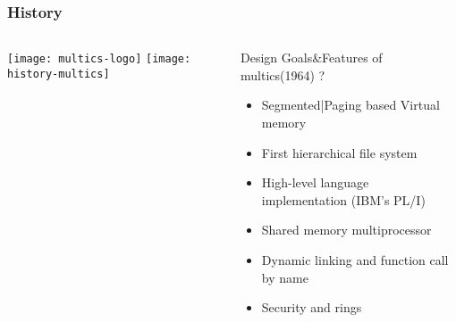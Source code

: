 \begin{frame}[plain]
	\frametitle{History}
	
	
	
	\begin{columns}
		
		\begin{column}{.5\textwidth}
			\texttt{[image: multics-logo]}
			\texttt{[image: history-multics]}
			
			
			
		\end{column}
		
		\begin{column}{.5\textwidth}
			
			\large
			Design Goals\&Features of  multics(1964) ?
			\begin{itemize}
				\item Segmented|Paging based Virtual memory


				
				\item First hierarchical file system
				

				
				\item High-level language implementation (IBM's PL/I)
				
				\item Shared memory multiprocessor
				\item Dynamic linking and function call by name
				\item Security and rings
			\end{itemize}	

		\end{column}
		
		
	\end{columns}
	
	
\end{frame}

